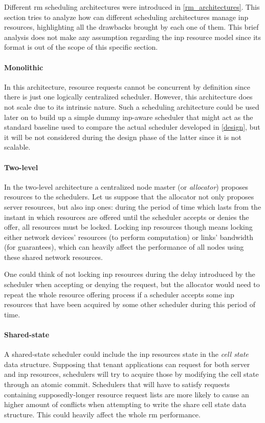 Different \gls{rm} scheduling architectures were introduced in \autoref{rm_architectures}.
This section tries to analyze how can different scheduling architectures manage \gls{inp} resources, highlighting all the drawbacks brought by each one of them.
This brief analysis does not make any assumption regarding the \gls{inp} resource model since its format is out of the scope of this specific section.

\paragraph{Monolithic}
In this architecture, resource requests cannot be concurrent by definition since there is just one logically centralized scheduler.
However, this architecture does not scale due to its intrinsic nature.
Such a scheduling architecture could be used later on to build up a simple dummy \gls{inp}-aware scheduler that might act as the standard baseline used to compare the actual scheduler developed in \autoref{design}, but it will be not considered during the design phase of the latter since it is not scalable.

\paragraph{Two-level}
In the two-level architecture a centralized node master (or \textit{allocator}) proposes resources to the schedulers.
Let us suppose that the allocator not only proposes server resources, but also \gls{inp} ones: during the period of time which lasts from the instant in which resources are offered until the scheduler accepts or denies the offer, all resources must be locked.
Locking \gls{inp} resources though means locking either network devices' resources (to perform computation) or links' bandwidth (for guarantees), which can heavily affect the performance of all nodes using these shared network resources.\par
One could think of not locking \gls{inp} resources during the delay introduced by the scheduler when accepting or denying the request, but the allocator would need to repeat the whole resource offering process if a scheduler accepts some \gls{inp} resources that have been acquired by some other scheduler during this period of time.

\paragraph{Shared-state}
A shared-state scheduler could include the \gls{inp} resources state in the \textit{cell state} data structure.
Supposing that tenant applications can request for both server and \gls{inp} resources, schedulers will try to acquire those by modifying the cell state through an atomic commit.
Schedulers that will have to satisfy requests containing supposedly-longer resource request lists are more likely to cause an higher amount of conflicts when attempting to write the share cell state data structure.
This could heavily affect the whole \gls{rm} performance.